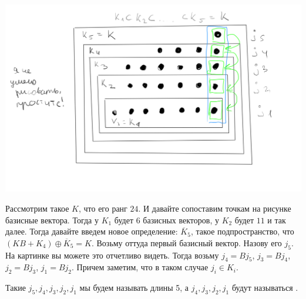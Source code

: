 \begin{center}
   \includegraphics[width = 15cm]{assets/7_9-zhordan-sample.png}
\end{center}

Рассмотрим такое $K$, что его ранг $24$. И давайте  сопоставим точкам на рисунке базисные вектора. Тогда у $K_1$ будет $6$ базисных векторов, у $K_2$ будет $11$ и так далее. Тогда давайте введем новое определение: $\overline{K}_5$, такое подпространство, что $(KB + K_4) \oplus \overline{K}_5 = K$. Возьму оттуда первый базисный вектор. Назову его $j_5$. На картинке вы можете это отчетливо видеть. Тогда возьму $j_4 =Bj_5$, $j_3 =Bj_4$, $j_2 =Bj_3$, $j_1 =Bj_2$. Причем заметим, что в таком случае $j_i \in K_i$. 

Такие $j_5,j_4,j_3,j_2,j_1$ мы будем называть  длины 5, а $j_4,j_3,j_2,j_1$ будут называться .

